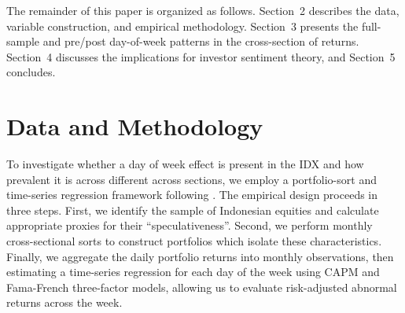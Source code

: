 \documentclass[
	a4paper,
	10pt,
	twoside,
]{LTJournalArticle}
\begin{document}
The remainder of this paper is organized as follows. Section~2 describes the data, variable construction, and empirical methodology. Section~3 presents the full-sample and pre/post day-of-week patterns in the cross-section of returns. Section~4 discusses the implications for investor sentiment theory, and Section~5 concludes.


%
%
%
%


\section{Data and Methodology}

To investigate whether a day of week effect is present in the IDX and how prevalent it is across different across sections, we employ a portfolio-sort and time-series regression framework following \citet{birru2018}. The empirical design proceeds in three steps. First, we identify the sample of Indonesian equities and calculate appropriate proxies for their ``speculativeness''. Second, we perform monthly cross-sectional sorts to construct portfolios which isolate these characteristics. Finally, we aggregate the daily portfolio returns into monthly observations, then estimating a time-series regression for each day of the week using CAPM and Fama-French three-factor models, allowing us to evaluate risk-adjusted abnormal returns across the week.
\end{document}
